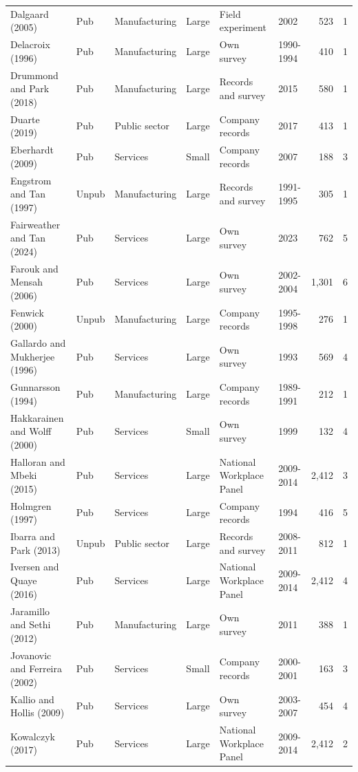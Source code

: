 \documentclass[11pt]{article}
\begin{document}
{\begin{longtable}{llllllrr}
Dalgaard (2005) & Pub & Manufacturing & Large & Field experiment & 2002 & 523 & 1 \\
Delacroix (1996) & Pub & Manufacturing & Large & Own survey & 1990-1994 & 410 & 1 \\
Drummond and Park (2018) & Pub & Manufacturing & Large & Records and survey & 2015 & 580 & 1 \\
Duarte (2019) & Pub & Public sector & Large & Company records & 2017 & 413 & 1 \\
Eberhardt (2009) & Pub & Services & Small & Company records & 2007 & 188 & 3 \\
Engstrom and Tan (1997) & Unpub & Manufacturing & Large & Records and survey & 1991-1995 & 305 & 1 \\
Fairweather and Tan (2024) & Pub & Services & Large & Own survey & 2023 & 762 & 5 \\
Farouk and Mensah (2006) & Pub & Services & Large & Own survey & 2002-2004 & 1,301 & 6 \\
Fenwick (2000) & Unpub & Manufacturing & Large & Company records & 1995-1998 & 276 & 1 \\
Gallardo and Mukherjee (1996) & Pub & Services & Large & Own survey & 1993 & 569 & 4 \\
Gunnarsson (1994) & Pub & Manufacturing & Large & Company records & 1989-1991 & 212 & 1 \\
Hakkarainen and Wolff (2000) & Pub & Services & Small & Own survey & 1999 & 132 & 4 \\
Halloran and Mbeki (2015) & Pub & Services & Large & National Workplace Panel & 2009-2014 & 2,412 & 3 \\
Holmgren (1997) & Pub & Services & Large & Company records & 1994 & 416 & 5 \\
Ibarra and Park (2013) & Unpub & Public sector & Large & Records and survey & 2008-2011 & 812 & 1 \\
Iversen and Quaye (2016) & Pub & Services & Large & National Workplace Panel & 2009-2014 & 2,412 & 4 \\
Jaramillo and Sethi (2012) & Pub & Manufacturing & Large & Own survey & 2011 & 388 & 1 \\
Jovanovic and Ferreira (2002) & Pub & Services & Small & Company records & 2000-2001 & 163 & 3 \\
Kallio and Hollis (2009) & Pub & Services & Large & Own survey & 2003-2007 & 454 & 4 \\
Kowalczyk (2017) & Pub & Services & Large & National Workplace Panel & 2009-2014 & 2,412 & 2 \\

\end{longtable}}
\end{document}
